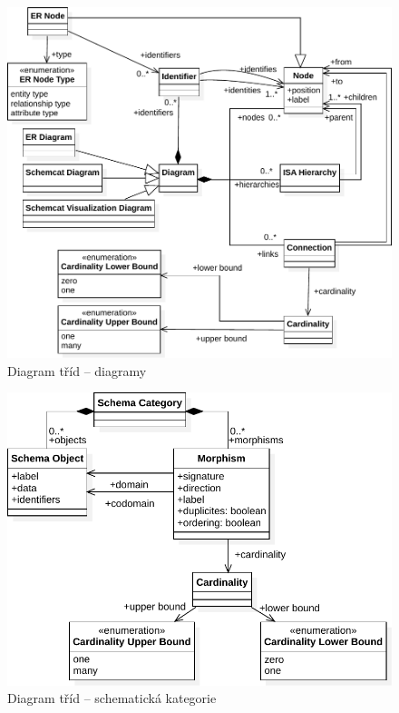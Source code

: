 \begin{figure}[!htb]
  \centering
  \includegraphics[width=\maxwidth{\textwidth}]{../img/diagrams/diagram-model.pdf}
  \caption{Diagram tříd -- diagramy}
  \label{fig:class-diagram:diagram}
\end{figure}
\begin{figure}[!htb]
  \centering
  \includegraphics[width=\maxwidth{\textwidth}]{../img/diagrams/schema-category-model.pdf}
  \caption{Diagram tříd -- schematická kategorie}
  \label{fig:class-diagram:schemcat}
\end{figure}

